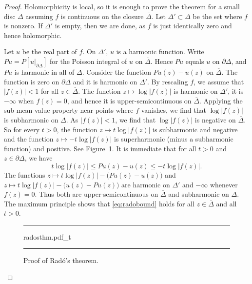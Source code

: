 \documentclass[12pt,openany]{book}
\newcommand{\sabs}[1]{\lvert {#1} \rvert}
\newcommand{\abs}[1]{\left\lvert {#1} \right\rvert}
\theoremstyle{plain}
\theoremstyle{remark}
\theoremstyle{definition}
\newenvironment{myfig}{%
\begin{figure}[h!t]
\noindent\rule{\textwidth}{0.5pt}\vspace{12pt}\par\centering}%
{\par\noindent\rule{\textwidth}{0.5pt}
\end{figure}}
\theoremstyle{exercise}
\theoremstyle{example}
\newcommand{\figureref}[1]{\hyperref[#1]{Figure~\ref*{#1}}}
\begin{document}
\begin{proof}
Holomorphicity is local, so
it is enough to prove the theorem for a small disc $\Delta$
assuming $f$ is continuous
on the closure $\overline{\Delta}$.  Let $\Delta' \subset \Delta$ be the set
where $f$ is nonzero.  If $\Delta'$ is empty, then we are done, as
$f$ is just identically zero and hence holomorphic.

Let $u$ be the real part of $f$.  On $\Delta'$, $u$ is a harmonic function.
Write $Pu = P[u|_{\partial \Delta}]$ for the Poisson integral of $u$ on
$\overline{\Delta}$.  Hence $Pu$
equals $u$ on $\partial \Delta$, and $Pu$ is harmonic in all of $\Delta$.
Consider the function
$Pu(z) - u(z)$ on $\overline{\Delta}$.  The function is zero
on $\partial \Delta$ and it is harmonic on $\Delta'$.  By rescaling $f$,
we assume that $\abs{f(z)} < 1$ for all $z
\in \overline{\Delta}$. 
The function $z \mapsto \log \sabs{f(z)}$ is harmonic on $\Delta'$, it is
$-\infty$ when $f(z) = 0$, and hence it is upper-semicontinuous on
$\overline{\Delta}$.
Applying
the sub-mean-value property near points where $f$ vanishes,
we find that
$\log \sabs{f(z)}$ is subharmonic on $\Delta$.
As $\sabs{f(z)} < 1$, we find that
$\log \sabs{f(z)}$ is negative on $\overline{\Delta}$.
So for every $t > 0$,
the function
$z \mapsto t \log \abs{f(z)}$ is subharmonic and negative
and the function
$z \mapsto -t \log \abs{f(z)}$ is superharmonic
(minus a subharmonic function) and positive.
See \figureref{fig:radosthm}.
It is immediate that for all $t > 0$ and
$z \in \partial \Delta$,
we have
\begin{equation} \label{eq:radobound}
t \log \abs{f(z)} \leq Pu(z)-u(z) \leq -t \log \abs{f(z)}  .
\end{equation}
The functions
$z \mapsto t \log \abs{f(z)} - \bigl(Pu(z)-u(z)\bigr)$
and
$z \mapsto t \log \abs{f(z)} - \bigl(u(z)-Pu(z)\bigr)$
are harmonic on $\Delta'$ and $-\infty$ whenever $f(z)=0$.
Thus both are upper-semicontinuous on $\overline{\Delta}$
and subharmonic on $\Delta$.
The maximum principle shows that
\eqref{eq:radobound} holds
for all $z \in \overline{\Delta}$ and all $t > 0$.

\begin{myfig}
{radosthm.pdf_t}
\caption{Proof of Rad\'o's theorem.\label{fig:radosthm}}
\end{myfig}


\end{proof}
\end{document}
